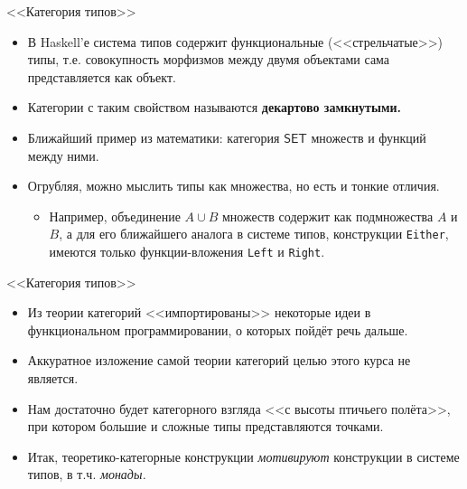 \documentclass[xcolor=dvipsnames]{beamer}
\begin{document}
\begin{frame}{<<Категория типов>>}

\begin{itemize}[<+->]
 \item  В Haskell'е система типов содержит функциональные (<<стрельчатые>>) типы, т.е. совокупность морфизмов между двумя объектами сама представляется как объект.
 \item Категории с таким свойством называются {\bf декартово замкнутыми.}
 \item Ближайший пример из математики: категория $\mathsf{SET}$ множеств и функций между ними.
 \item Огрубляя, можно мыслить типы как множества, но есть и тонкие отличия.
 \begin{itemize}
 \item Например, объединение $A \cup B$ множеств содержит как подмножества $A$ и $B$, а для его ближайшего аналога в системе типов, конструкции \texttt{Either}, имеются только функции-вложения \texttt{Left} и \texttt{Right}.
 \end{itemize}
\end{itemize}

\end{frame}

\begin{frame}{<<Категория типов>>}
 
 \begin{itemize}[<+->]
  \item Из теории категорий <<импортированы>> некоторые идеи в функциональном программировании, о которых пойдёт речь дальше.
  \item Аккуратное изложение самой теории категорий целью этого курса не является.
  \item Нам достаточно будет категорного взгляда <<с высоты птичьего полёта>>, при котором большие и сложные типы представляются точками.
  \item Итак, теоретико-категорные конструкции
{\em мотивируют} конструкции в системе типов, в т.ч. {\em монады.}
 \end{itemize}

\end{frame}
\end{document}
